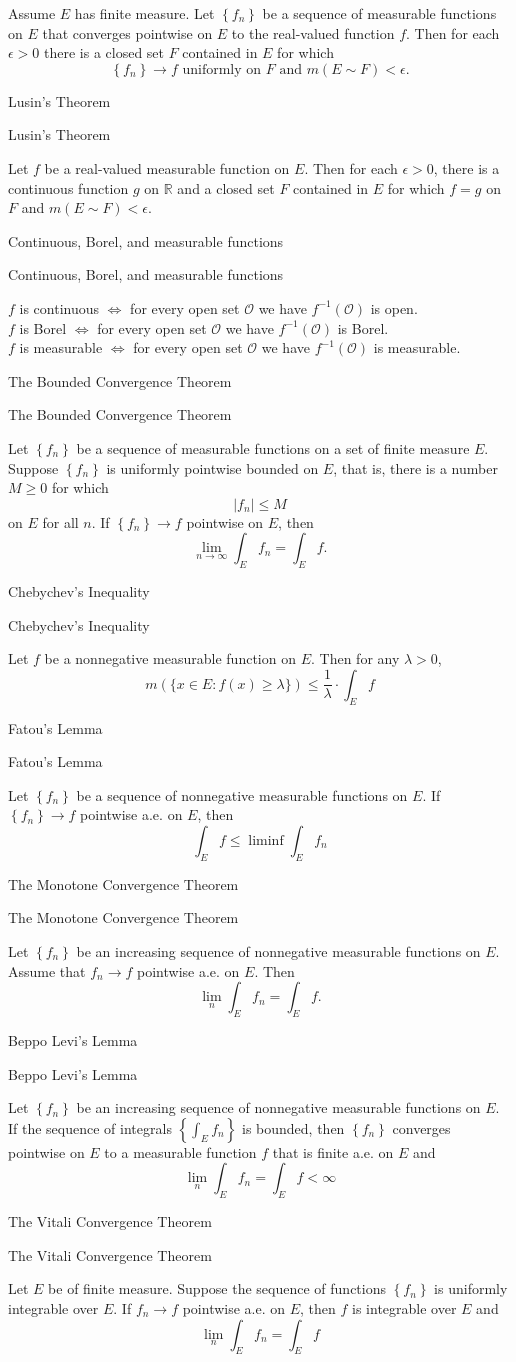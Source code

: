 \documentclass[17pt]{extarticle}
\newcommand{\boxset}[2]{\begin{mdframed}[style=darkQuesion]
#1
\end{mdframed}
\newpage
\begin{mdframed}[style=darkQuesion]
  #1
    \end{mdframed}
\begin{mdframed}[style=darkAnswer]
  #2
    \end{mdframed}
    \newpage
}
\begin{document}
{Assume $E$ has finite measure. Let $\left\{f_{n}\right\}$ be a sequence of measurable functions on $E$ that converges pointwise on $E$ to the real-valued function $f$. Then for each $\epsilon>0$ there is a closed set $F$ contained in $E$ for which
$$
\left\{f_{n}\right\} \rightarrow f \text { uniformly on } F \text { and } m(E \sim F)<\epsilon .
$$
}
\boxset{Lusin's Theorem }
{Let $f$ be a real-valued measurable function on $E$. Then for each $\epsilon>0$, there is a continuous function $g$ on $\mathbb{R}$ and a closed set $F$ contained in $E$ for which $f=g$ on $F$ and $m(E \sim F)<\epsilon$.}
\boxset{Continuous, Borel, and measurable functions}
{
$f$ is continuous $\Longleftrightarrow$ for every open set $\mathcal{O}$ we have $f^{-1}(\mathcal{O})$ is open.\[\ \]
$f$ is Borel $\Longleftrightarrow$ for every open set $\mathcal{O}$ we have $f^{-1}(\mathcal{O})$ is Borel.\[\ \]
$f$ is measurable $\Longleftrightarrow$ for every open set $\mathcal{O}$ we have $f^{-1}(\mathcal{O})$ is measurable.\[\ \]
}
\boxset{The Bounded Convergence Theorem}
{Let $\left\{f_{n}\right\}$ be a sequence of measurable functions on a set of finite measure $E$. Suppose $\left\{f_{n}\right\}$ is uniformly pointwise bounded on $E$, that is, there is a number $M \geq 0$ for which
$$
\left|f_{n}\right| \leq M
$$
on $E$ for all $n$. If $\left\{f_{n}\right\} \rightarrow f$ pointwise on $E$, then
$$
\lim _{n \rightarrow \infty} \int_{E} f_{n}=\int_{E} f .
$$
}
\boxset{Chebychev's Inequality}
{Let $f$ be a nonnegative measurable function on $E$. Then for any $\lambda>0$,
$$
m(\{x \in E: f(x) \geq \lambda\}) \leq \frac{1}{\lambda} \cdot \int_{E} f
$$
}
\boxset{Fatou's Lemma}
{Let $\left\{f_{n}\right\}$ be a sequence of nonnegative measurable functions on $E$. If $\left\{f_{n}\right\} \rightarrow f$ pointwise a.e. on $E$, then
$$
\int_{E} f \leq \liminf \int_{E} f_{n}
$$
}
\boxset{The Monotone Convergence Theorem}
{Let $\left\{f_{n}\right\}$ be an increasing sequence of nonnegative measurable functions on $E$. Assume that $f_{n} \rightarrow f$ pointwise a.e. on $E$. Then
$$
\lim _{n} \int_{E} f_{n}=\int_{E} f .
$$
}
\boxset{Beppo Levi's Lemma}
{Let $\left\{f_{n}\right\}$ be an increasing sequence of nonnegative measurable functions on $E$. If the sequence of integrals $\left\{\int_{E} f_{n}\right\}$ is bounded, then $\left\{f_{n}\right\}$ converges pointwise on $E$ to a measurable function $f$ that is finite a.e. on $E$ and
$$
\lim _{n} \int_{E} f_{n}=\int_{E} f<\infty
$$
}
\boxset{The Vitali Convergence Theorem}
{Let $E$ be of finite measure. Suppose the sequence of functions $\left\{f_{n}\right\}$ is uniformly integrable over $E$. If $f_{n} \rightarrow f$ pointwise a.e. on $E$, then $f$ is integrable over $E$ and
$$
\lim _{n} \int_{E} f_{n}=\int_{E} f
$$
}
\end{document}

